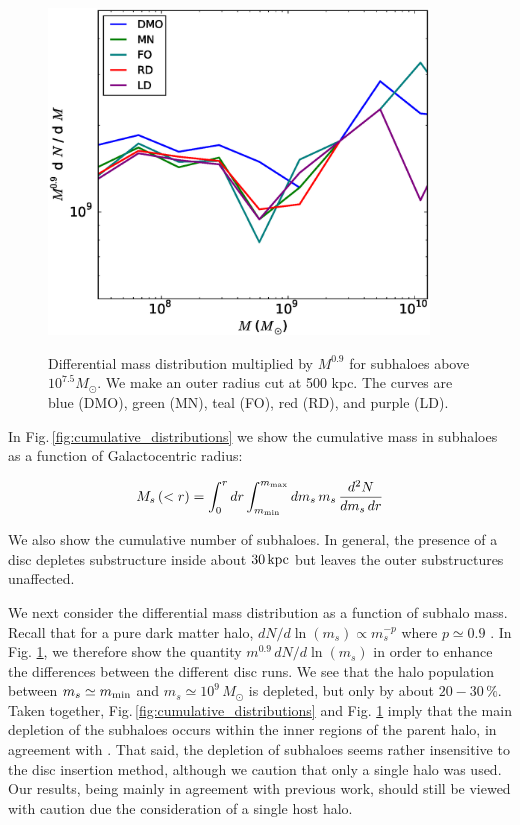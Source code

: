 \begin{figure} 
\centering 
{\includegraphics[width=0.9\textwidth]{../figures/differential_halo_mass_fn_five_sims.eps}}
\caption{ Differential mass distribution
  multiplied by $M^{0.9}$ for subhaloes above $10^{7.5} M_\odot$. We
  make an outer radius cut at 500 kpc. The curves are blue
  (DMO), green (MN), teal (FO), red (RD), and purple (LD). }
\label{fig:differential_mass_distributions}
\end{figure}

In Fig.\,\ref{fig:cumulative_distributions} we show the cumulative
mass in subhaloes as a function of Galactocentric radius:

\begin{equation}
M_s\left (<r\right )  = \int_0^r dr \int_{m_{\rm min}}^{m_{\rm
    max}} dm_s\,m_s\,\frac{d^2 N}{dm_s\,dr}
\end{equation}

\noindent We also show the cumulative number of subhaloes.  In
general, the presence of a disc depletes substructure inside about
$30\,{\rm kpc}$ but leaves the outer substructures unaffected.

We next consider the differential mass distribution as a function of
subhalo mass.  Recall that for a pure dark matter halo,
$dN/d\ln(m_s)\propto m_s^{-p}$ where $p\simeq 0.9$
\citep[e.g.][]{gao2004}.  In
Fig. \ref{fig:differential_mass_distributions}, we therefore show the
quantity $m^{0.9}\,dN/d\ln(m_s)$ in order to enhance the differences
between the different disc runs.  We see that the halo population
between $m_s \simeq m_{\rm min}$ and $m_s\simeq 10^9\,M_\odot$ is
depleted, but only by about $20-30\,\%$.  Taken together,
Fig.\,\ref{fig:cumulative_distributions} and
Fig. \ref{fig:differential_mass_distributions} imply that the main
depletion of the subhaloes occurs within the inner regions of the
parent halo, in agreement with \citet{DOhngiaSubstructureDepletion,Sawala2017,GKSubhaloDepletion17}.  That said, the depletion of subhaloes seems rather
insensitive to the disc insertion method, although we caution that only a single halo was used. Our results, being mainly in agreement with previous work, should still be viewed with caution due the consideration of a single host halo.

